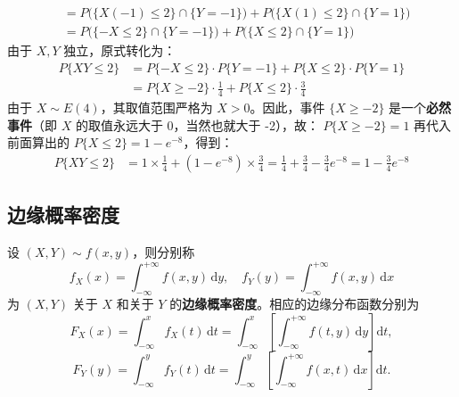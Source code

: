 \documentclass[lang=cn,11pt]{elegantbook}
\begin{document}
\begin{solution}
\begin{align*}
&= P\big( \{X(-1) \leqslant 2\} \cap \{Y=-1\} \big) + P\big( \{X(1) \leqslant 2\} \cap \{Y=1\} \big) \\
&= P\big( \{-X \leqslant 2\} \cap \{Y=-1\} \big) + P\big( \{X \leqslant 2\} \cap \{Y=1\} \big)
\end{align*}
由于 $X, Y$ 独立，原式转化为：
\begin{align*}
P\{XY \leqslant 2\} &= P\{-X \leqslant 2\} \cdot P\{Y=-1\} + P\{X \leqslant 2\} \cdot P\{Y=1\} \\
&= P\{X \geqslant -2\} \cdot \frac{1}{4} + P\{X \leqslant 2\} \cdot \frac{3}{4}
\end{align*}
由于 $X \sim E(4)$，其取值范围严格为 $X > 0$。因此，事件 $\{X \geqslant -2\}$ 是一个\textbf{必然事件}（即 $X$ 的取值永远大于 0，当然也就大于 -2），故：
\(
P\{X \geqslant -2\} = 1
\)
再代入前面算出的 $P\{X \leqslant 2\} = 1 - e^{-8}$，得到：
\begin{align*}
P\{XY \leqslant 2\} &= 1 \times \frac{1}{4} + (1 - e^{-8}) \times \frac{3}{4} = \frac{1}{4} + \frac{3}{4} - \frac{3}{4} e^{-8} = 1 - \frac{3}{4} e^{-8}
\end{align*}
\end{solution}

\subsection{边缘概率密度}

\begin{definition} \label{def:marginal-pdf}
设 $(X,Y) \sim f(x,y)$，则分别称
\[
f_X(x) = \int_{-\infty}^{+\infty}f(x,y)\,\mathrm{d}y, \quad f_Y(y) = \int_{-\infty}^{+\infty}f(x,y)\,\mathrm{d}x
\]
为 $(X,Y)$ 关于 $X$ 和关于 $Y$ 的\textbf{边缘概率密度}。相应的边缘分布函数分别为
\[
F_X(x) = \int_{-\infty}^{x}f_X(t)\,\mathrm{d}t = \int_{-\infty}^{x}\left[\int_{-\infty}^{+\infty}f(t,y)\,\mathrm{d}y\right]\mathrm{d}t,
\]
\[
F_Y(y) = \int_{-\infty}^{y}f_Y(t)\,\mathrm{d}t = \int_{-\infty}^{y}\left[\int_{-\infty}^{+\infty}f(x,t)\,\mathrm{d}x\right]\mathrm{d}t.
\]
\end{definition}
\end{document}
